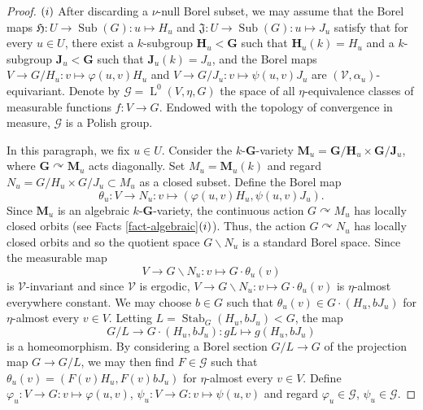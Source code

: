 \documentclass[11pt]{amsart}
\numberwithin{equation}{section}
\theoremstyle{plain}
\theoremstyle{definition}
\newcommand{\Stab}{\operatorname{Stab}}
\newcommand{\Sub}{\operatorname{Sub}}
\newcommand{\rL}{\operatorname{L}}
\begin{document}
\begin{proof}
$(\rm i)$ After discarding a $\nu$-null Borel subset, we may assume that the Borel maps $\mathfrak H : U \to \Sub(G) : u \mapsto H_u$ and $\mathfrak J : U \to \Sub(G) : u \mapsto J_u$ satisfy that for every $u \in U$, there exist a $k$-subgroup $\mathbf H_u < \mathbf G$ such that $\mathbf H_u(k) = H_u$ and a $k$-subgroup $\mathbf J_u < \mathbf G$ such that $\mathbf J_u(k) = J_u$, and the Borel maps $V \to G/H_u : v \mapsto \varphi(u, v)H_u$ and $V \to G/J_u : v \mapsto \psi(u, v)J_u$ are $(\mathscr V, \alpha_u)$-equivariant. Denote by $\mathscr G = \rL^0(V, \eta, G)$ the space of all $\eta$-equivalence classes of measurable functions $f : V \to G$. Endowed with the topology of convergence in measure, $\mathscr G$ is a Polish group. 

In this paragraph, we fix $u \in U$. Consider the $k$-$\mathbf G$-variety $\mathbf M_u = \mathbf G/\mathbf H_u \times \mathbf G/\mathbf J_u$, where $\mathbf G \curvearrowright \mathbf M_u$ acts diagonally. Set $M_u = \mathbf M_u(k)$ and regard $N_u = G/H_u \times G/J_u \subset M_u$ as a closed subset. Define the Borel map 
$$\theta_u : V \to N_u : v \mapsto (\varphi(u, v)H_u, \psi(u, v)J_u).$$
Since $\mathbf M_u$ is an algebraic $k$-$\mathbf G$-variety, the continuous action $G \curvearrowright M_u$ has locally closed orbits (see Facts \ref{fact-algebraic}$(\rm i)$). Thus, the action $G \curvearrowright N_u$ has locally closed orbits and so the quotient space $G\backslash N_u$ is a standard Borel space. Since the measurable map 
$$V \to G\backslash N_u : v \mapsto G\cdot \theta_u(v)$$ is $\mathscr V$-invariant and since $\mathscr V$ is ergodic, $V \to G\backslash N_u : v \mapsto G\cdot \theta_u(v)$ is $\eta$-almost everywhere constant. We may choose $b \in G$ such that $\theta_u(v) \in G \cdot (H_u, b J_u)$ for $\eta$-almost every $v \in V$. Letting $L = \Stab_G(H_u, b J_u) < G$, the map 
$$G/L \to G \cdot (H_u, b J_u) : gL \mapsto g(H_u, bJ_u)$$
 is a homeomorphism. By considering a Borel section $G/L \to G$ of the projection map $G \to G/L$, we may then find $F \in \mathscr G$ such that $\theta_u(v) = (F(v)H_u, F(v)b J_u)$ for $\eta$-almost every $v \in V$. Define $\varphi_u : V \to G : v \mapsto \varphi(u, v)$, $\psi_u : V \to G : v \mapsto \psi(u, v)$ and regard $\varphi_u \in \mathscr G$, $\psi_u \in \mathscr G$. 
 

\end{proof}
\end{document}
